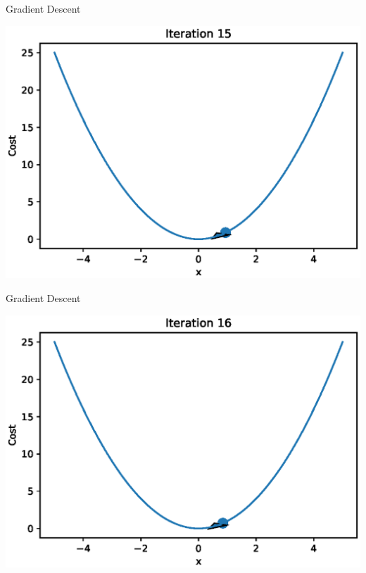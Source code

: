 \documentclass{beamer}
\begin{document}
\begin{frame}{Gradient Descent}
  \begin{center}
       \includegraphics[totalheight=6cm]{gradient-descent/iteration-15.eps}
   \end{center}
\end{frame}

\begin{frame}{Gradient Descent}
  \begin{center}
       \includegraphics[totalheight=6cm]{gradient-descent/iteration-16.eps}
   \end{center}
\end{frame}
\end{document}
